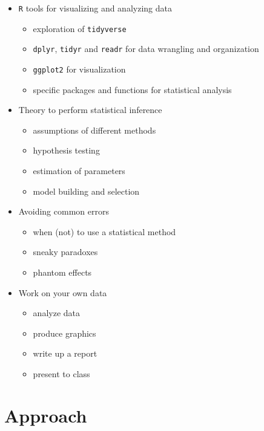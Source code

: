 \documentclass[
  letterpaper,
  DIV=11,
  numbers=noendperiod]{scrreprt}
\providecommand{\tightlist}{%
  \setlength{\itemsep}{0pt}\setlength{\parskip}{0pt}}\usepackage{longtable,booktabs,array}
\begin{document}
\begin{itemize}
\tightlist
\item
  \texttt{R} tools for visualizing and analyzing data

  \begin{itemize}
  \tightlist
  \item
    exploration of \texttt{tidyverse}
  \item
    \texttt{dplyr}, \texttt{tidyr} and \texttt{readr} for data wrangling
    and organization
  \item
    \texttt{ggplot2} for visualization
  \item
    specific packages and functions for statistical analysis
  \end{itemize}
\item
  Theory to perform statistical inference

  \begin{itemize}
  \tightlist
  \item
    assumptions of different methods
  \item
    hypothesis testing
  \item
    estimation of parameters
  \item
    model building and selection
  \end{itemize}
\item
  Avoiding common errors

  \begin{itemize}
  \tightlist
  \item
    when (not) to use a statistical method
  \item
    sneaky paradoxes
  \item
    phantom effects
  \end{itemize}
\item
  Work on your own data

  \begin{itemize}
  \tightlist
  \item
    analyze data
  \item
    produce graphics
  \item
    write up a report
  \item
    present to class
  \end{itemize}
\end{itemize}

\hypertarget{approach}{%
\section*{Approach}\label{approach}}
\end{document}
